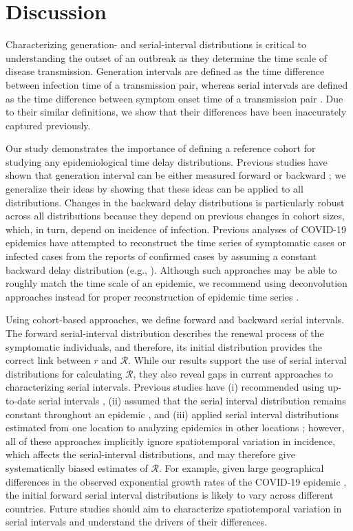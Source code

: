 \documentclass[12pt]{article}
\newcommand{\RR}{\ensuremath{{\mathcal R}}\xspace}
\begin{document}
\section{Discussion}

Characterizing generation- and serial-interval distributions is critical to understanding the outset of an outbreak as they determine the time scale of disease transmission.
Generation intervals are defined as the time difference between infection time of a transmission pair, whereas serial intervals are defined as the time difference between symptom onset time of a transmission pair \citep{svensson2007note}.
Due to their similar definitions, we show that their differences have been inaccurately captured previously.

Our study demonstrates the importance of defining a reference cohort for studying any epidemiological time delay distributions.
Previous studies have shown that generation interval can be either measured forward or backward \citep{champredon2015intrinsic,britton2019estimation};
we generalize their ideas by showing that these ideas can be applied to all distributions.
Changes in the backward delay distributions is particularly robust across all distributions because they depend on previous changes in cohort sizes, which, in turn, depend on incidence of infection.
Previous analyses of COVID-19 epidemics have attempted to reconstruct the time series of symptomatic cases or infected cases from the reports of confirmed cases by assuming a constant backward delay distribution (e.g., \cite{tempvar, park2020potential, shim2020transmission}).
Although such approaches may be able to roughly match the time scale of an epidemic, we recommend using deconvolution approaches instead for proper reconstruction of epidemic time series \citep{goldstein2009reconstructing}.

Using cohort-based approaches, we define forward and backward serial intervals.
The forward serial-interval distribution describes the renewal process of the symptomatic individuals, and therefore, its initial distribution  provides the correct link between $r$ and \RR.
While our results support the use of serial interval distributions for calculating \RR, 
they also reveal gaps in current approaches to characterizing serial intervals.
Previous studies have (i) recommended using up-to-date serial intervals \citep{thompson2019improved}, (ii) assumed that the serial interval distribution remains constant throughout an epidemic \citep{wallinga2004different, cori2013new}, and (iii) applied serial interval distributions estimated from one location to analyzing epidemics in other locations \citep{tempvar};
however, all of these approaches implicitly ignore spatiotemporal variation in incidence, which affects the serial-interval distributions, and may therefore give systematically biased estimates of \RR. 
For example, given large geographical differences in the observed exponential growth rates of the COVID-19 epidemic \citep{tempvar}, the initial forward serial interval distributions is likely to vary across different countries.
Future studies should aim to characterize spatiotemporal variation in serial intervals and understand the drivers of their differences.
\end{document}

